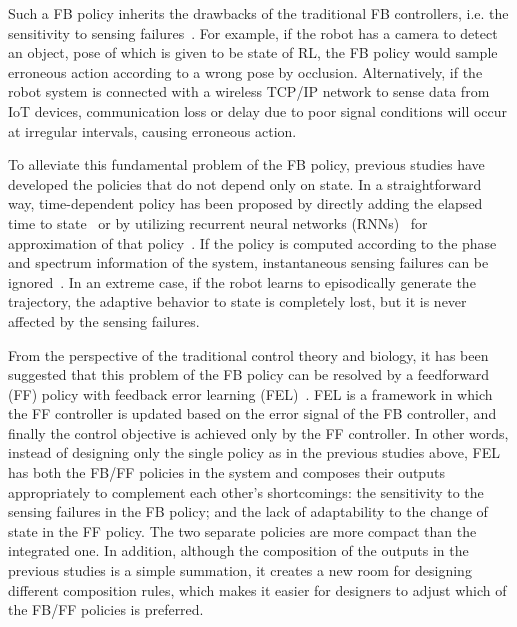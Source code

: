 \documentclass{bmcart}
\begin{document}
Such a FB policy inherits the drawbacks of the traditional FB controllers, i.e. the sensitivity to sensing failures~\cite{sugimoto2020relaxation}.
For example, if the robot has a camera to detect an object, pose of which is given to be state of RL, the FB policy would sample erroneous action according to a wrong pose by occlusion.
Alternatively, if the robot system is connected with a wireless TCP/IP network to sense data from IoT devices, communication loss or delay due to poor signal conditions will occur at irregular intervals, causing erroneous action.

To alleviate this fundamental problem of the FB policy, previous studies have developed the policies that do not depend only on state.
In a straightforward way, time-dependent policy has been proposed by directly adding the elapsed time to state~\cite{musial2007feed} or by utilizing recurrent neural networks (RNNs)~\cite{hochreiter1997long,murata2013learning} for approximation of that policy~\cite{lee2020stochastic}.
If the policy is computed according to the phase and spectrum information of the system, instantaneous sensing failures can be ignored~\cite{sharma2018phase,azizzadenesheli2016reinforcement}.
In an extreme case, if the robot learns to episodically generate the trajectory, the adaptive behavior to state is completely lost, but it is never affected by the sensing failures.

From the perspective of the traditional control theory and biology, it has been suggested that this problem of the FB policy can be resolved by a feedforward (FF) policy with feedback error learning (FEL)~\cite{miyamoto1988feedback,nakanishi2004feedback,sugimoto2008feedback,sugimoto2020relaxation}.
FEL is a framework in which the FF controller is updated based on the error signal of the FB controller, and finally the control objective is achieved only by the FF controller.
In other words, instead of designing only the single policy as in the previous studies above, FEL has both the FB/FF policies in the system and composes their outputs appropriately to complement each other's shortcomings: the sensitivity to the sensing failures in the FB policy; and the lack of adaptability to the change of state in the FF policy.
The two separate policies are more compact than the integrated one.
In addition, although the composition of the outputs in the previous studies is a simple summation, it creates a new room for designing different composition rules, which makes it easier for designers to adjust which of the FB/FF policies is preferred.
\end{document}
